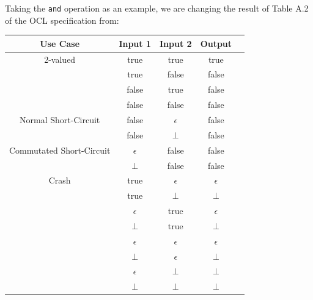 \documentclass[
]{ceurart}
\begin{document}




Taking the \verb|and| operation as an example, we are changing the result of Table A.2 of the OCL specification from:

\begin{center}
	\begin{tabular}{|c||c|c||c||c|}
		\hline
		Use Case & Input 1 & Input 2 & Output \\
		\hline
		\hline
		2-valued & true & true & true \\
		& true & false & false \\
		& false & true & false \\
		& false & false & false \\
		\hline
		Normal Short-Circuit & false & $\epsilon$ & false \\
		& false & $\bot$ & false \\
		Commutated Short-Circuit & $\epsilon$ & false & false \\
		& $\bot$ & false & false \\
		\hline
		Crash & true & $\epsilon$ & $\epsilon$ \\
		& true & $\bot$ & $\bot$ \\
		& $\epsilon$ & true & $\epsilon$ \\
		& $\bot$ & true & $\bot$ \\
		& $\epsilon$ & $\epsilon$ & $\epsilon$ \\
		& $\bot$ & $\epsilon$ & $\bot$ \\
		& $\epsilon$ & $\bot$ & $\bot$ \\
		& $\bot$ & $\bot$ & $\bot$ \\
		\hline
	\end{tabular}
\end{center}
\end{document}
